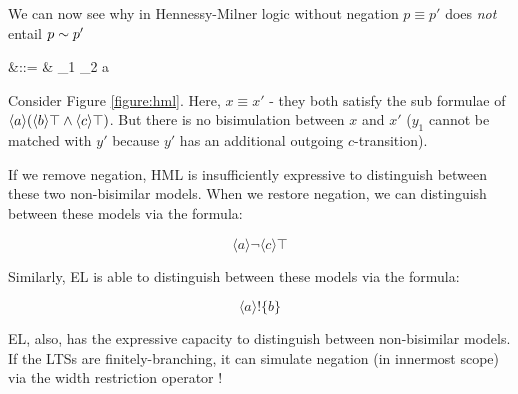
We can now see why in Hennessy-Milner logic without negation $p \equiv
p'$ does \emph{not} entail $p \sim p'$

\begin{GRAMMAR}
  \phi 
    &\quad ::= \quad&
  \top \fOr \phi_1 \AND \phi_2  \fOr \langle a \rangle \phi
\end{GRAMMAR}



\NI Consider Figure \ref{figure:hml}.  Here, $x \equiv x'$ - they both
satisfy the sub formulae of $\langle a \rangle (\langle b \rangle \top
\land \langle c \rangle \top)$.  But there is no bisimulation between
$x$ and $x'$ ($y_1$ cannot be matched with $y'$ because $y'$ has an
additional outgoing $c$-transition).

If we remove negation, HML is insufficiently expressive to distinguish
between these two non-bisimilar models.  When we restore negation, we
can distinguish between these models via the formula:

\[
   \langle a \rangle \neg \langle c \rangle \top
\]

\NI Similarly, EL is able to distinguish between these models via the
formula:

\[
  \langle a \rangle ! \{b\}
\]

\NI EL, also, has the expressive capacity to distinguish between
non-bisimilar models. If the LTSs are finitely-branching, it can
simulate negation (in innermost scope) via the width restriction
operator !
